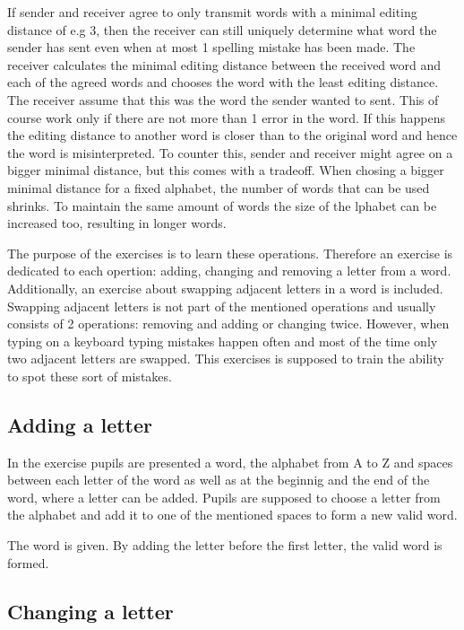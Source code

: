If sender and receiver agree to only transmit words with a minimal editing distance of e.g 3, then the receiver can still uniquely determine what word the sender has sent even when at most 1 spelling mistake has been made. The receiver calculates the minimal editing distance between the received word and each of the agreed words and chooses the word with the least editing distance.
The receiver assume that this was the word the sender wanted to sent. This of course work only if there are not more than 1 error in the word. If this happens the editing distance to another word is closer than to the original word and hence the word is misinterpreted. To counter this, sender and receiver might agree on a bigger minimal distance, but this comes with a tradeoff. When chosing a bigger minimal distance for a fixed alphabet, the number of words that can be used shrinks. To maintain the same amount of words the size of the lphabet can be increased too, resulting in longer words.

The purpose of the  exercises is to learn these operations. Therefore an exercise is dedicated to each opertion: adding, changing and removing a letter from a word. Additionally, an exercise about swapping adjacent letters in a word is included. Swapping adjacent letters is not part of the mentioned operations and usually consists of 2 operations: removing and adding or changing twice. However, when typing on a keyboard typing mistakes happen often and most of the time only two adjacent letters are swapped. This exercises is supposed to train the ability to spot these sort of mistakes.

\subsection*{Adding a letter}

In the  exercise pupils are presented a word, the alphabet from A to Z and spaces between each letter of the word as well as at the beginnig and the end of the word, where a letter can be added. Pupils are supposed to choose a letter from the alphabet and add it to one of the mentioned spaces to form a new valid word.

\begin{example}
    The word  is given. By adding the letter  before the first letter, the valid word  is formed.
\end{example}

\subsection*{Changing a letter}

